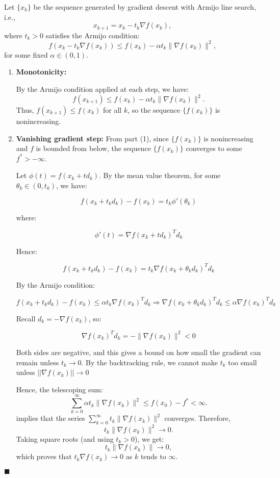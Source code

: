 \documentclass{ExerciseSheet}
\begin{document}
\begin{solution}
Let $\{x_k\}$ be the sequence generated by gradient descent with Armijo line search, i.e.,
\[
x_{k+1} = x_k - t_k \nabla f(x_k),
\]
where $t_k > 0$ satisfies the Armijo condition:
\[
f(x_k - t_k \nabla f(x_k)) \leq f(x_k) - \alpha t_k \|\nabla f(x_k)\|^2,
\]
for some fixed $\alpha \in (0,1)$.
\begin{enumerate}
    \item \textbf{ Monotonicity:}  


By the Armijo condition applied at each step, we have:
\[
f(x_{k+1}) \leq f(x_k) - \alpha t_k \|\nabla f(x_k)\|^2.
\]
Thus, $f(x_{k+1}) \leq f(x_k)$ for all $k$, so the sequence $\{f(x_k)\}$ is nonincreasing.

\item \textbf{ Vanishing gradient step:}  
From part (1), since $\{f(x_k)\}$ is nonincreasing and $f$ is bounded from below, the sequence $\{f(x_k)\}$ converges to some $f^* > -\infty$. 


\vspace{0.5cm}
Let $ \phi(t) = f(x_k + t d_k) $. By the mean value theorem, for some $ \theta_k \in (0, t_k)$, we have:

\[
f(x_k + t_k d_k) - f(x_k) = t_k \phi'(\theta_k)
\]

where:

\[
\phi'(t) = \nabla f(x_k + t d_k)^T d_k
\]

Hence:

\[
f(x_k + t_k d_k) - f(x_k) = t_k \nabla f(x_k + \theta_k d_k)^T d_k
\]

By the Armijo condition:

\[
f(x_k + t_k d_k) - f(x_k) \leq \alpha t_k \nabla f(x_k)^T d_k
\Rightarrow \nabla f(x_k + \theta_k d_k)^T d_k \leq \alpha \nabla f(x_k)^T d_k
\]

Recall $ d_k = -\nabla f(x_k) $, so:

\[
\nabla f(x_k)^T d_k = -\|\nabla f(x_k)\|^2 < 0
\]

Both sides are negative, and this gives a bound on how small the gradient can remain unless $ t_k \to 0 $. By the backtracking rule, we cannot make $t_k$ too small unless $||\nabla f(x_k)|| \to 0$




Hence, the telescoping sum:
\[
\sum_{k=0}^\infty \alpha t_k \|\nabla f(x_k)\|^2 \leq f(x_0) - f^* < \infty.
\]
implies that the series $\sum_{k=0}^\infty t_k \|\nabla f(x_k)\|^2$ converges. Therefore,
\[
t_k \|\nabla f(x_k)\|^2 \to 0.
\]
Taking square roots (and using $t_k > 0$), we get:
\[
t_k \|\nabla f(x_k)\| \to 0,
\]
which proves that $t_k \nabla f(x_k) \to 0$ as  $k$ tends to $\infty$.
\end{enumerate}
\hfill $\blacksquare$
\end{solution}
\end{document}
